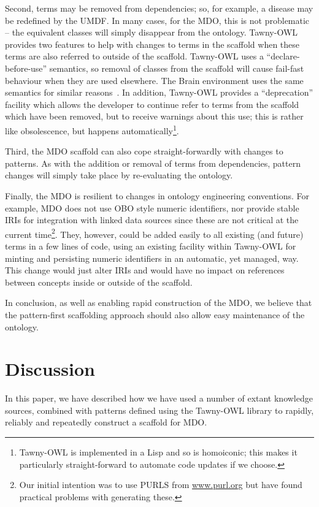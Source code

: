 \documentclass{icbo}
\newcommand{\tawny}{Tawny-OWL\xspace}
\begin{document}
Second, terms may be removed from dependencies; so, for example, a disease may
be redefined by the UMDF. In many cases, for the MDO, this is not problematic
-- the equivalent classes will simply disappear from the ontology. \tawny
provides two features to help with changes to terms in the scaffold when these
terms are also referred to outside of the scaffold. \tawny uses a
``declare-before-use'' semantics, so removal of classes from the scaffold will
cause fail-fast behaviour when they are used elsewhere. The Brain environment
uses the same semantics for similar reasons~\citep{croset2013}. In addition,
\tawny provides a ``deprecation'' facility which allows the developer to
continue refer to terms from the scaffold which have been removed, but to
receive warnings about this use; this is rather like obsolescence, but happens
automatically\footnote{\tawny is implemented in a Lisp and so is homoiconic;
  this makes it particularly straight-forward to automate code updates if we
  choose.}.

Third, the MDO scaffold can also cope straight-forwardly with changes
to patterns.  As with the addition or removal of terms from
dependencies, pattern changes will simply take place by re-evaluating
the ontology.

Finally, the MDO is resilient to changes in ontology engineering
conventions.  For example, MDO does not use OBO style numeric
identifiers, nor provide stable IRIs for integration with linked data
sources since these are not critical at the current time\footnote{Our
  initial intention was to use PURLS from \url{www.purl.org} but have
  found practical problems with generating these.}. They, however,
could be added easily to all existing (and future) terms in a few
lines of code, using an existing facility within \tawny for minting
and persisting numeric identifiers in an automatic, yet managed,
way. This change would just alter IRIs and would have no impact on
references between concepts inside or outside of the scaffold.

In conclusion, as well as enabling rapid construction of the MDO, we
believe that the pattern-first scaffolding approach should also allow
easy maintenance of the ontology.

\section{Discussion}
\label{sec:discussion}

In this paper, we have described how we have used a number of extant
knowledge sources, combined with patterns defined using the \tawny
library to rapidly, reliably and repeatedly construct a scaffold for MDO.
\end{document}

